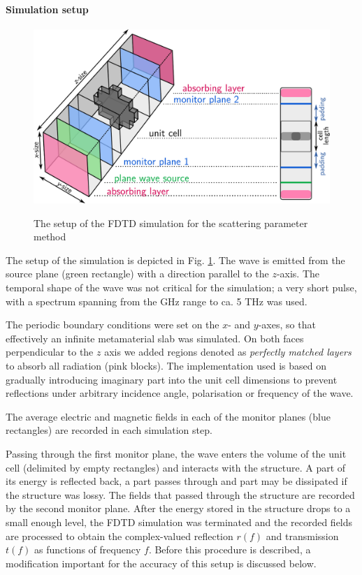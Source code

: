 \paragraph{Simulation setup} %
\begin{figure}[ht] \centering \caption{The setup of the FDTD simulation for the scattering parameter method
} \includegraphics[width=12cm]{img/meep_geometry.pdf}  \label{fg_fdtd_sparam} \end{figure} %
The setup of the simulation is depicted in Fig. \ref{fg_fdtd_sparam}. The wave is emitted from the source plane (green rectangle) with a direction parallel to the $z$-axis. The temporal shape of the wave was not critical for the simulation; a very short pulse, with a spectrum spanning from the GHz range to ca. 5 THz was used. 

The periodic boundary conditions were set on the $x$- and $y$-axes, so that effectively an infinite metamaterial slab was simulated. On both faces perpendicular to the $z$ axis we added regions denoted as \textit{perfectly matched layers} \cite{oskooi2011distinguishing} to absorb all radiation (pink blocks). The implementation used is based on gradually introducing imaginary part into the unit cell dimensions to prevent reflections under arbitrary incidence angle, polarisation or frequency of the wave.

The average electric and magnetic fields in each of the monitor planes (blue rectangles) are recorded  in each simulation step.  

Passing through the first monitor plane, the wave enters the volume of the unit cell (delimited by empty rectangles) and interacts with the structure. A part of its energy is reflected back, a part passes through and part may be dissipated if the structure was lossy. The fields that passed through the structure are recorded by the second monitor plane. After the energy stored in the structure drops to a small enough level, the FDTD simulation was terminated and the recorded fields are processed to obtain the complex-valued reflection $r(f)$ and transmission $t(f)$ as functions of frequency $f$. Before this procedure is described, a modification important for the accuracy of this setup is discussed below.

